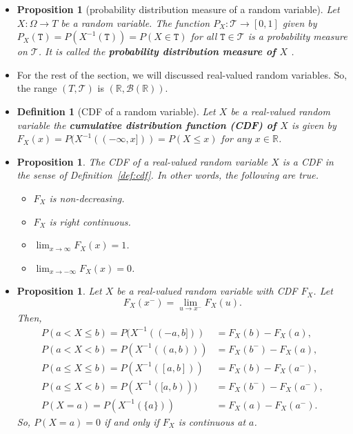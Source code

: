 \documentclass[10pt]{article}
\newtheorem{definition}[lemma]{Definition}
\newtheorem{proposition}[lemma]{Proposition}
\numberwithin{lemma}{section}
\newcommand{\mcal}[1]{\mathcal{#1}}
\newcommand{\Real}{\mathbb{R}}
\begin{document}
\begin{itemize}
  \item \begin{proposition}[probability distribution measure of a random variable]
    Let $X: \Omega \rightarrow T$ be a random variable. The function $P_X: \mcal{T} \rightarrow [0,1]$ given by $P_X(\mathtt{T}) = P(X^{-1}(\mathtt{T})) = P(X \in \mathtt{T})$ for all $\mathtt{T} \in \mcal{T}$ is a probability measure on $\mcal{T}$. It is called the {\bf probability distribution measure of $X$} .
  \end{proposition}


  \item For the rest of the section, we will discussed real-valued random variables. So, the range $(T,\mcal{T})$ is $(\Real, \mcal{B}(\Real))$.
  
  \item \begin{definition}[CDF of a random variable]
    Let $X$ be a real-valued random variable the {\bf cumulative distribution function (CDF) of $X$} is given by $F_X(x) = P(X^{-1}((-\infty, x])) = P(X \leq x)$ for any $x \in \Real$.
  \end{definition}

  \item \begin{proposition}
    The CDF of a real-valued random variable $X$ is a CDF in the sense of Definition~\ref{def:cdf}. In other words, the following are true.
    \begin{itemize}
      \item $F_X$ is non-decreasing.
      \item $F_X$ is right continuous.
      \item $\lim_{x \rightarrow \infty} F_X(x) = 1$.
      \item $\lim_{x \rightarrow -\infty} F_X(x) = 0$.
    \end{itemize}  
  \end{proposition}

  \item \begin{proposition}
    Let $X$ be a real-valued random variable with CDF $F_X$. Let $$F_X(x^-) = \lim_{u \rightarrow x^-} F_X(u).$$ Then,
    \begin{align*}
      P(a < X \leq b) = P(X^{-1}((-a, b])) &= F_X(b) - F_X(a), \\
      P(a < X < b) = P(X^{-1}((a,b))) &= F_X(b^-) - F_X(a), \\
      P(a \leq X \leq b) = P(X^{-1}([a,b])) &= F_X(b) - F_X(a^-), \\
      P(a \leq X < b) = P(X^{-1}([a,b))) &= F_X(b^-) - F_X(a^-), \\
      P(X = a) = P(X^{-1}(\{a\})) &= F_X(a) - F_X(a^-).
    \end{align*}
    So, $P(X = a) = 0$ if and only if $F_X$ is continuous at $a$.
  \end{proposition}
\end{itemize}
\end{document}
